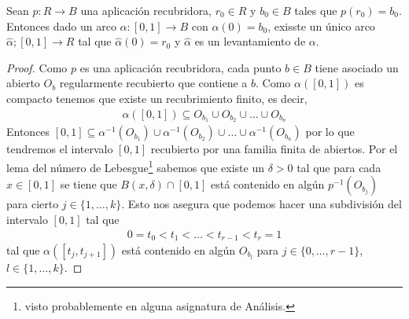 \begin{ejemplo}
\begin{figure}[H]
%
    \end{figure}%

\end{ejemplo}

\begin{lema}
    Sean $p:R\to B$ una aplicación recubridora, $r_0\in R$ y $b_0\in B$ tales que $p(r_0)=b_0$. Entonces dado un arco $\alpha:[0,1]\to B$ con $\alpha(0)=b_0$, exisste un único arco $\hat{\alpha};[0,1]\to R$ tal que $\hat{\alpha}(0) = r_0$ y $\hat{\alpha}$ es un levantamiento de $\alpha$.

    \begin{proof}
        Como $p$ es una aplicación recubridora, cada punto $b\in B$ tiene asociado un abierto $O_b$ regularmente recubierto que contiene a $b$. Como $\alpha([0,1])$ es compacto tenemos que existe un recubrimiento finito, es decir,
        \begin{gather*}
            \alpha([0,1]) \subseteq O_{b_1} \cup O_{b_2}\cup \dots \cup O_{b_n}
        \end{gather*}
        Entonces $[0,1]\subseteq \alpha^{-1}( O_{b_1}) \cup \alpha^{-1}(O_{b_2})\cup \dots \cup \alpha^{-1}(O_{b_n})$ por lo que tendremos el intervalo $[0,1]$ recubierto por una familia finita de abiertos. Por el lema del número de Lebesgue\footnote{visto probablemente en alguna asignatura de Análisis.} sabemos que existe un $\delta>0$ tal que para cada $x\in[0,1]$ se tiene que $B(x,\delta)\cap[0,1]$ está contenido en algún $p^{-1}(O_{b_j})$ para cierto $j\in\{1,\dots,k\}$. Esto nos asegura que podemos hacer una subdivisión del intervalo $[0,1]$ tal que
        \begin{gather*}
            0 = t_0 < t_1 < \dots < t_{r-1} < t_r = 1
        \end{gather*}
        tal que $\alpha([t_j, t_{j+1}])$ está contenido en algún $O_{b_l}$ para $j\in\{0,\dots,r-1\}$, $l\in\{1,\dots,k\}$.


\end{proof}
\end{lema}
